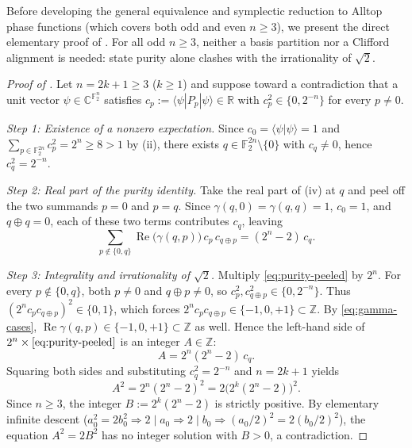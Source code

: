 \documentclass[11pt,a4paper]{article}
\theoremstyle{plain}
\theoremstyle{definition}
\theoremstyle{remark}
\newcommand{\C}{\mathbb{C}}
\newcommand{\R}{\mathbb{R}}
\newcommand{\Z}{\mathbb{Z}}
\newcommand{\F}{\mathbb{F}}
\newcommand{\RePart}{\operatorname{Re}}
\newcommand{\braket}[2]{\langle#1|#2\rangle}
\newcommand{\expval}[2]{\langle#1|#2|#1\rangle}
\numberwithin{equation}{section}
\begin{document}
Before developing the general equivalence and symplectic reduction to Alltop phase functions (which covers both odd and even $n \ge 3$), we present the direct elementary proof of . For all odd $n \ge 3$, neither a basis partition nor a Clifford alignment is needed: state purity alone clashes with the irrationality of $\sqrt{2}$.

\begin{proof}[Proof of ]
Let $n = 2k + 1 \ge 3$ ($k \ge 1$) and suppose toward a contradiction that a unit vector $\psi \in \C^{\F_2^n}$ satisfies $c_p := \expval{\psi}{P_p} \in \R$ with $c_p^2 \in \{0, 2^{-n}\}$ for every $p \neq 0$.

\emph{Step 1: Existence of a nonzero expectation.}
Since $c_0 = \braket{\psi}{\psi} = 1$ and $\sum_{p \in \F_2^{2n}} c_p^2 = 2^n \ge 8 > 1$ by (ii), there exists $q \in \F_2^{2n} \setminus \{0\}$ with $c_q \neq 0$, hence $c_q^2 = 2^{-n}$.

\emph{Step 2: Real part of the purity identity.}
Take the real part of (iv) at $q$ and peel off the two summands $p = 0$ and $p = q$. Since $\gamma(q, 0) = \gamma(q, q) = 1$, $c_0 = 1$, and $q \oplus q = 0$, each of these two terms contributes $c_q$, leaving
\begin{equation}\label{eq:purity-peeled}
  \sum_{p \notin \{0, q\}} \RePart\bigl(\gamma(q, p)\bigr)\, c_p\, c_{q \oplus p} = (2^n - 2)\, c_q.
\end{equation}

\emph{Step 3: Integrality and irrationality of $\sqrt{2}$.}
Multiply \eqref{eq:purity-peeled} by $2^n$. For every $p \notin \{0, q\}$, both $p \neq 0$ and $q \oplus p \neq 0$, so $c_p^2, c_{q \oplus p}^2 \in \{0, 2^{-n}\}$. Thus $(2^n c_p c_{q \oplus p})^2 \in \{0, 1\}$, which forces $2^n c_p c_{q \oplus p} \in \{-1, 0, +1\} \subset \Z$. By \eqref{eq:gamma-cases}, $\RePart\gamma(q, p) \in \{-1, 0, +1\} \subset \Z$ as well. Hence the left-hand side of $2^n \times \eqref{eq:purity-peeled}$ is an integer $A \in \Z$:
\[
  A = 2^n (2^n - 2)\, c_q.
\]
Squaring both sides and substituting $c_q^2 = 2^{-n}$ and $n = 2k + 1$ yields
\[
  A^2 = 2^n (2^n - 2)^2 = 2\bigl(2^k (2^n - 2)\bigr)^2.
\]
Since $n \ge 3$, the integer $B := 2^k(2^n - 2)$ is strictly positive. By elementary infinite descent ($a_0^2 = 2b_0^2 \Rightarrow 2 \mid a_0 \Rightarrow 2 \mid b_0 \Rightarrow (a_0/2)^2 = 2(b_0/2)^2$), the equation $A^2 = 2B^2$ has no integer solution with $B > 0$, a contradiction.
\end{proof}
\end{document}
